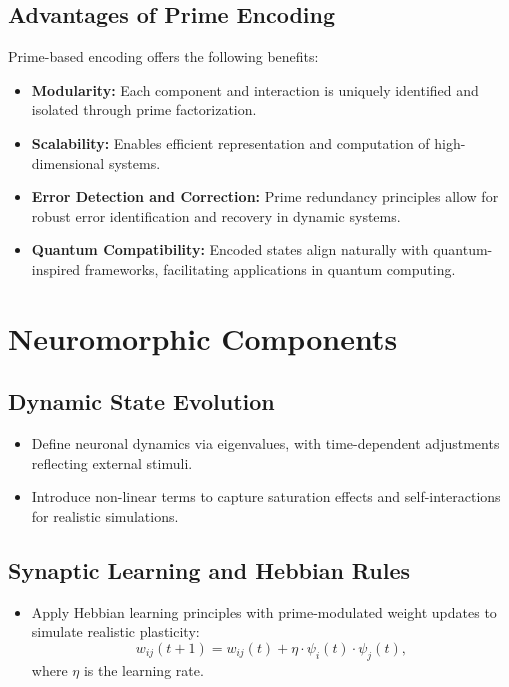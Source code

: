 \documentclass{article}
\theoremstyle{plain}
\begin{document}
\subsection{Advantages of Prime Encoding}
Prime-based encoding offers the following benefits:
\begin{itemize}
    \item \textbf{Modularity:} Each component and interaction is uniquely identified and isolated through prime factorization.
    \item \textbf{Scalability:} Enables efficient representation and computation of high-dimensional systems.
    \item \textbf{Error Detection and Correction:} Prime redundancy principles allow for robust error identification and recovery in dynamic systems.
    \item \textbf{Quantum Compatibility:} Encoded states align naturally with quantum-inspired frameworks, facilitating applications in quantum computing.
\end{itemize}

\section{Neuromorphic Components}

\subsection{Dynamic State Evolution}
\begin{itemize}
    \item Define neuronal dynamics via eigenvalues, with time-dependent adjustments reflecting external stimuli.
    \item Introduce non-linear terms to capture saturation effects and self-interactions for realistic simulations.
\end{itemize}

\subsection{Synaptic Learning and Hebbian Rules}
\begin{itemize}
    \item Apply Hebbian learning principles with prime-modulated weight updates to simulate realistic plasticity:
    \[
    w_{ij}(t+1) = w_{ij}(t) + \eta \cdot \psi_i(t) \cdot \psi_j(t),
    \]
    where \(\eta\) is the learning rate.
\end{itemize}
\end{document}
